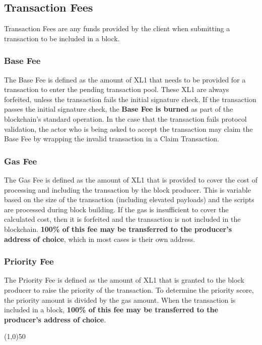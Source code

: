 \documentclass{article}
\begin{document}
\subsection{Transaction Fees}
Transaction Fees are any funds provided by the client when submitting a
transaction to be included in a block.

\subsubsection{Base Fee}
The Base Fee is defined as the amount of XL1 that needs to be provided for a
transaction to enter the pending transaction pool. These XL1 are always
forfeited, unless the transaction fails the initial signature check. If the
transaction passes the initial signature check, the \textbf{Base Fee is burned}
as part of the blockchain's standard operation. In the case that the
transaction fails protocol validation, the actor who is being asked to accept
the transaction may claim the Base Fee by wrapping the invalid transaction in a
Claim Transaction.

\subsubsection{Gas Fee}
The Gas Fee is defined as the amount of XL1 that is provided to cover the cost
of processing and including the transaction by the block producer. This is
variable based on the size of the transaction (including elevated payloads) and
the scripts are processed during block building. If the gas is insufficient to
cover the calculated cost, then it is forfeited and the transaction is not
included in the blockchain. \textbf{100\% of this fee may be transferred to the
    producer's address of choice}, which in most cases is their own address.

\subsubsection{Priority Fee}
The Priority Fee is defined as the amount of XL1 that is granted to the block
producer to raise the priority of the transaction. To determine the priority
score, the priority amount is divided by the gas amount. When the transaction
is included in a block, \textbf{100\% of this fee may be transferred to the
    producer's address of choice}.

\begin{center}
    \line(1,0){50}
\end{center}
\end{document}
